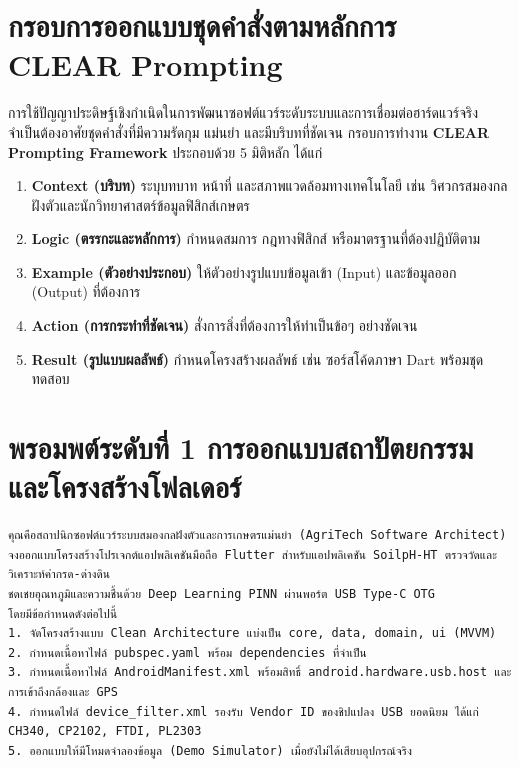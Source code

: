 \section{กรอบการออกแบบชุดคำสั่งตามหลักการ CLEAR Prompting}

การใช้ปัญญาประดิษฐ์เชิงกำเนิดในการพัฒนาซอฟต์แวร์ระดับระบบและการเชื่อมต่อฮาร์ดแวร์จริง จำเป็นต้องอาศัยชุดคำสั่งที่มีความรัดกุม แม่นยำ และมีบริบทที่ชัดเจน กรอบการทำงาน \textbf{CLEAR Prompting Framework} ประกอบด้วย 5 มิติหลัก ได้แก่
\begin{enumerate}
    \item \textbf{Context (บริบท)} ระบุบทบาท หน้าที่ และสภาพแวดล้อมทางเทคโนโลยี เช่น วิศวกรสมองกลฝังตัวและนักวิทยาศาสตร์ข้อมูลฟิสิกส์เกษตร
    \item \textbf{Logic (ตรรกะและหลักการ)} กำหนดสมการ กฎทางฟิสิกส์ หรือมาตรฐานที่ต้องปฏิบัติตาม
    \item \textbf{Example (ตัวอย่างประกอบ)} ให้ตัวอย่างรูปแบบข้อมูลเข้า (Input) และข้อมูลออก (Output) ที่ต้องการ
    \item \textbf{Action (การกระทำที่ชัดเจน)} สั่งการสิ่งที่ต้องการให้ทำเป็นข้อๆ อย่างชัดเจน
    \item \textbf{Result (รูปแบบผลลัพธ์)} กำหนดโครงสร้างผลลัพธ์ เช่น ซอร์สโค้ดภาษา Dart พร้อมชุดทดสอบ
\end{enumerate}

\section{พรอมพต์ระดับที่ 1 การออกแบบสถาปัตยกรรมและโครงสร้างโฟลเดอร์}

\begin{promptbox}
\begin{lstlisting}
คุณคือสถาปนิกซอฟต์แวร์ระบบสมองกลฝังตัวและการเกษตรแม่นยำ (AgriTech Software Architect)
จงออกแบบโครงสร้างโปรเจกต์แอปพลิเคชันมือถือ Flutter สำหรับแอปพลิเคชัน SoilpH-HT ตรวจวัดและวิเคราะห์ค่ากรด-ด่างดิน
ชดเชยอุณหภูมิและความชื้นด้วย Deep Learning PINN ผ่านพอร์ต USB Type-C OTG
โดยมีข้อกำหนดดังต่อไปนี้
1. จัดโครงสร้างแบบ Clean Architecture แบ่งเป็น core, data, domain, ui (MVVM)
2. กำหนดเนื้อหาไฟล์ pubspec.yaml พร้อม dependencies ที่จำเป็น
3. กำหนดเนื้อหาไฟล์ AndroidManifest.xml พร้อมสิทธิ์ android.hardware.usb.host และการเข้าถึงกล้องและ GPS
4. กำหนดไฟล์ device_filter.xml รองรับ Vendor ID ของชิปแปลง USB ยอดนิยม ได้แก่ CH340, CP2102, FTDI, PL2303
5. ออกแบบให้มีโหมดจำลองข้อมูล (Demo Simulator) เมื่อยังไม่ได้เสียบอุปกรณ์จริง
\end{lstlisting}
\end{promptbox}

